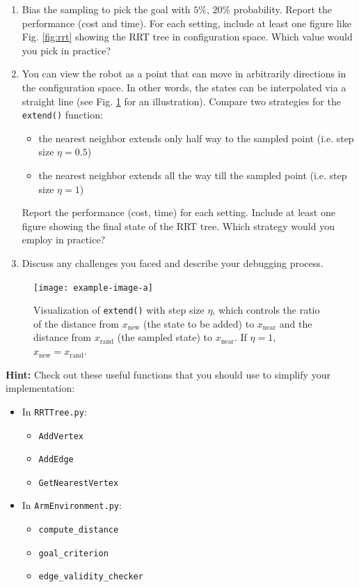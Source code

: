 \documentclass[tp]{lcc}
\begin{document}
\begin{enumerate}
    \item Bias the sampling to pick the goal with $5\%$, $20\%$ probability. Report the performance (cost and time). For each setting, include at least one figure like Fig. \ref{fig:rrt} showing the RRT tree in configuration space. Which value would you pick in practice?
    \item You can view the robot as a point that can move in arbitrarily directions in the configuration space. In other words, the states can be interpolated via a straight line (see Fig. \ref{fig:extend} for an illustration). Compare two strategies for the \texttt{extend()} function:
    \begin{itemize}
        \item the nearest neighbor extends only half way to the sampled point (i.e. step size $\eta=0.5$)
        \item the nearest neighbor extends all the way till the sampled point (i.e. step size $\eta=1$)
    \end{itemize}
    Report the performance (cost, time) for each setting. Include at least one figure showing the final state of the RRT tree. Which strategy would you employ in practice?
    \item Discuss any challenges you faced and describe your debugging process.
\end{enumerate}

\begin{figure}[h]
    \centering
    \texttt{[image: example-image-a]}
    \caption{Visualization of \texttt{extend()} with step size $\eta$, which controls the ratio of the distance from $x_{\text{new}}$ (the state to be added) to $x_{\text{near}}$ and the distance from $x_{\text{rand}}$ (the sampled state) to $x_{\text{near}}$. If $\eta=1$, $x_{\text{new}}=x_{\text{rand}}$.}
    \label{fig:extend}
\end{figure}

\textbf{Hint:}
Check out these useful functions that you should use to simplify your implementation:
\begin{itemize}
    \item In \texttt{RRTTree.py}:
    \begin{itemize}
        \item \texttt{AddVertex}
        \item \texttt{AddEdge}
        \item \texttt{GetNearestVertex}
    \end{itemize}
    \item In \texttt{ArmEnvironment.py}:
    \begin{itemize}
        \item \texttt{compute\_distance}
        \item \texttt{goal\_criterion}
        \item \texttt{edge\_validity\_checker}
    \end{itemize}
\end{itemize}
\end{document}
